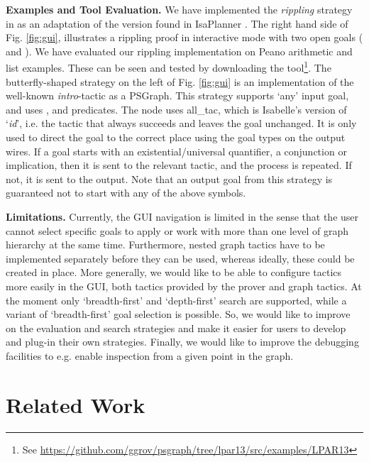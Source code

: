 \documentclass{llncs}
\begin{document}
\noindent \textbf{Examples and Tool Evaluation.}
We have implemented the \emph{rippling} strategy in \psgraphtool{} as an 
adaptation of the version found in IsaPlanner \cite{paper:Dixon:03}. The right
hand side of Fig. \ref{fig:gui}, illustrates a rippling proof in interactive mode
with two open goals ( and ). We have evaluated our rippling implementation
on  Peano arithmetic and list examples. These can be seen and tested
by downloading the tool\footnote{See \url{https://github.com/ggrov/psgraph/tree/lpar13/src/examples/LPAR13}}. 
The butterfly-shaped strategy on the left of Fig. \ref{fig:gui} is an implementation of the well-known \emph{intro}-tactic as a PSGraph. This strategy supports `any' input goal, and uses ,  and   predicates. 
The  node uses \textsf{all\_tac}, which is Isabelle's version of `\textit{id}', i.e. the tactic that 
always succeeds and leaves the goal unchanged. It is only used to direct the goal to the correct place using the goal types on the output wires. If a goal starts with 
an existential/universal quantifier, a conjunction or implication, then it is sent to the relevant tactic, and the process is repeated. If not, it is sent to the output. Note that an output goal from this strategy is guaranteed not to start with any of the above symbols.

\vspace{10pt}
\noindent \textbf{Limitations.} 
Currently, the GUI navigation is limited in the sense that the user cannot select specific goals to apply or work with
more than one level of graph hierarchy at the same time. Furthermore, nested graph tactics have to be implemented
separately before they can be used, whereas ideally, these could be created in place. More generally, we would like to
be able to configure tactics more easily in the GUI, both tactics provided by the prover and graph tactics. At the
moment only `breadth-first' and `depth-first' search are supported, while a variant of `breadth-first' goal selection is
possible. So, we would like to improve on the evaluation and search strategies and make it easier for users to develop
and plug-in their own strategies. Finally, we would like to improve the debugging facilities to e.g. enable inspection
from a given point in the graph.


\beforesection
\section{Related Work} \label{sec:related}
\aftersection
\end{document}
